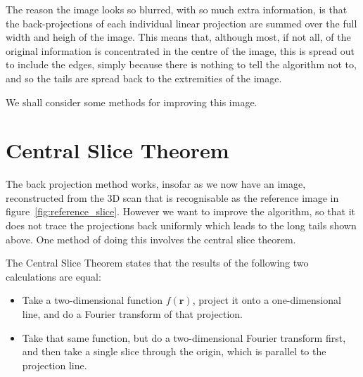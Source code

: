             The reason the image looks so blurred, with so much extra information, is that the back-projections of each individual linear projection are summed over the full width and heigh of the image. This means that, although most, if not all, of the original information is concentrated in the centre of the image, this is spread out to include the edges, simply because there is nothing to tell the algorithm not to, and so the tails are spread back to the extremities of the image.

            We shall consider some methods for improving this image.

\section{Central Slice Theorem} %
\label{sec:central_slice_theorem}
    The back projection method works, insofar as we now have an image, reconstructed from the 3D scan that is recognisable as the reference image in figure~\ref{fig:reference_slice}. However we want to improve the algorithm, so that it does not trace the projections back uniformly which leads to the long tails shown above. One method of doing this involves the central slice theorem.

    The Central Slice Theorem states that the results of the following two calculations are equal:
    \begin{itemize}
        \item Take a two-dimensional function $f(\boldsymbol{r})$, project it onto a one-dimensional line, and do a Fourier transform of that projection.
        \item Take that same function, but do a two-dimensional Fourier transform first, and then take a single slice through the origin, which is parallel to the projection line.
    \end{itemize}


